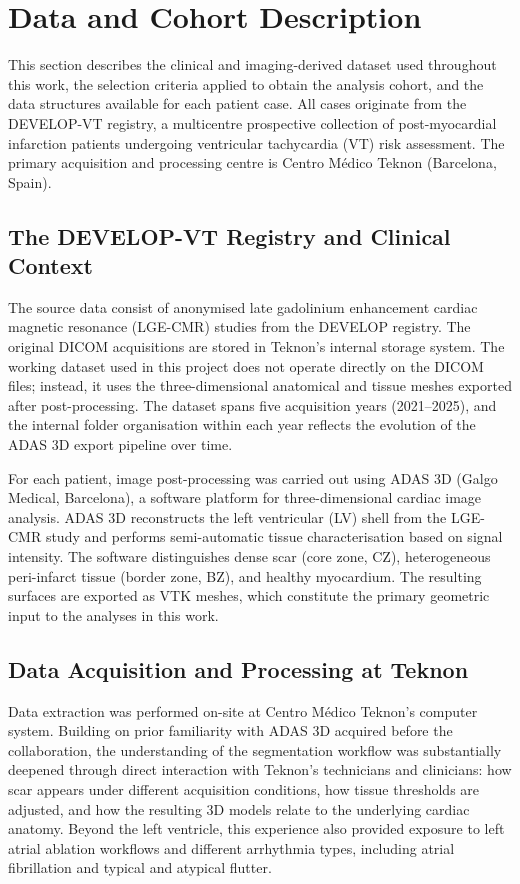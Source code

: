 \section{Data and Cohort Description}
\label{sec:data}

This section describes the clinical and imaging-derived dataset used throughout this work,
the selection criteria applied to obtain the analysis cohort, and the data structures available
for each patient case. All cases originate from the DEVELOP-VT registry, a multicentre
prospective collection of post-myocardial infarction patients undergoing ventricular
tachycardia (VT) risk assessment. The primary acquisition and processing centre is
Centro M\'{e}dico Teknon (Barcelona, Spain).

\subsection{The DEVELOP-VT Registry and Clinical Context}

The source data consist of anonymised late gadolinium enhancement cardiac magnetic
resonance (LGE-CMR) studies from the DEVELOP registry. The original DICOM acquisitions
are stored in Teknon's internal storage system. The working dataset used in this project does
not operate directly on the DICOM files; instead, it uses the three-dimensional anatomical
and tissue meshes exported after post-processing. The dataset spans five acquisition years
(2021--2025), and the internal folder organisation within each year reflects the evolution of
the ADAS 3D export pipeline over time.

For each patient, image post-processing was carried out using ADAS 3D (Galgo Medical,
Barcelona), a software platform for three-dimensional cardiac image analysis. ADAS 3D
reconstructs the left ventricular (LV) shell from the LGE-CMR study and performs
semi-automatic tissue characterisation based on signal intensity. The software distinguishes
dense scar (core zone, CZ), heterogeneous peri-infarct tissue (border zone, BZ), and
healthy myocardium. The resulting surfaces are exported as VTK meshes, which constitute
the primary geometric input to the analyses in this work.

\subsection{Data Acquisition and Processing at Teknon}

Data extraction was performed on-site at Centro M\'{e}dico Teknon's computer system.
Building on prior familiarity with ADAS 3D acquired before the collaboration, the
understanding of the segmentation workflow was substantially deepened through direct
interaction with Teknon's technicians and clinicians: how scar appears under different
acquisition conditions, how tissue thresholds are adjusted, and how the resulting 3D models
relate to the underlying cardiac anatomy. Beyond the left ventricle, this experience also
provided exposure to left atrial ablation workflows and different arrhythmia types, including
atrial fibrillation and typical and atypical flutter.

